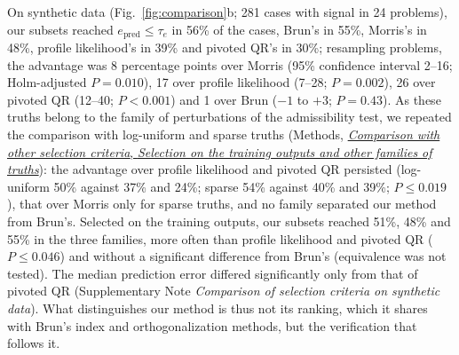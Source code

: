 \documentclass[pdflatex,sn-nature]{sn-jnl}
\theoremstyle{plain}
\newcommand{\mref}[2]{\hyperref[#1]{#2}}
\begin{document}
On synthetic data (Fig.~\ref{fig:comparison}b; 281 cases with signal in 24 problems), our subsets reached $e_{\mathrm{pred}}\le\tau_e$ in 56\% of the cases, Brun's in 55\%, Morris's in 48\%, profile likelihood's in 39\% and pivoted QR's in 30\%; resampling problems, the advantage was 8 percentage points over Morris (95\% confidence interval 2--16; Holm-adjusted $P=0.010$), 17 over profile likelihood (7--28; $P=0.002$), 26 over pivoted QR (12--40; $P<0.001$) and 1 over Brun ($-1$ to $+3$; $P=0.43$). As these truths belong to the family of perturbations of the admissibility test, we repeated the comparison with log-uniform and sparse truths (Methods, \mref{met:comp-train}{\emph{Comparison with other selection criteria}, \emph{Selection on the training outputs and other families of truths}}): the advantage over profile likelihood and pivoted QR persisted (log-uniform 50\% against 37\% and 24\%; sparse 54\% against 40\% and 39\%; $P\le0.019$), that over Morris only for sparse truths, and no family separated our method from Brun's. Selected on the training outputs, our subsets reached 51\%, 48\% and 55\% in the three families, more often than profile likelihood and pivoted QR ($P\le0.046$) and without a significant difference from Brun's (equivalence was not tested). The median prediction error differed significantly only from that of pivoted QR (Supplementary Note \textit{Comparison of selection criteria on synthetic data}). What distinguishes our method is thus not its ranking, which it shares with Brun's index and orthogonalization methods\cite{bib43,bib45}, but the verification that follows it.
\end{document}

